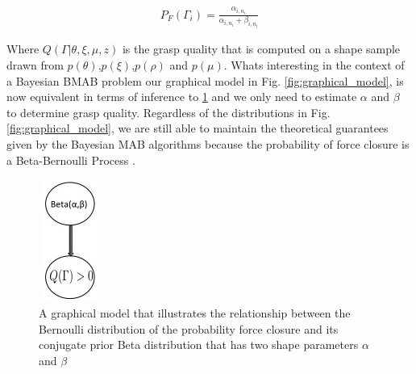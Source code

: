 \documentclass[journal,transmag]{IEEEtran}%
\begin{document}
\vspace{-2ex}
\begin{align}\label{eq:shape_sampling}
P_F(\Gamma_i) = \frac{\alpha_{i, n_i}}{\alpha_{i, n_i} + \beta_{i, n_i}}
\end{align}

Where $Q(\Gamma|\theta,\xi,\mu,z)$ is the grasp quality that is computed on a shape sample drawn from $p(\theta)$,$p(\xi)$,$p(\rho)$ and $p(\mu)$.
Whats interesting in the context of a Bayesian BMAB problem our graphical model in Fig. \ref{fig:graphical_model}, is now equivalent in terms of inference to \ref{fig:beta_model} and we only need to estimate $\alpha$ and $\beta$ to determine grasp quality.
Regardless of the distributions in Fig. \ref{fig:graphical_model}, we are still able to maintain the theoretical guarantees given by the Bayesian MAB algorithms because the probability of force closure is a Beta-Bernoulli Process \cite{agrawal2011analysis} \cite{kaufmann2012bayesian} 
\cite{weber1992gittins}. 


\begin{figure}[ht!]
\centering
\includegraphics[width = 2cm, height = 4cm]{figures/Slide9.jpg}
\caption{A graphical model that illustrates the relationship between the Bernoulli distribution of the probability force closure and its conjugate prior Beta distribution that has two shape parameters $\alpha$ and $\beta$ }
\vspace*{-10pt}
\label{fig:beta_model}
\end{figure}



\end{document}
